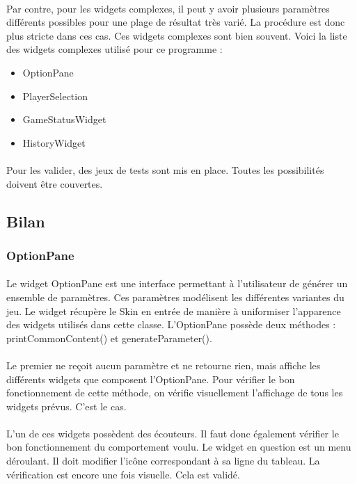\documentclass[11pt]{article} %
\begin{document}
\begin{sffamily}
\paragraph{}
Par contre, pour les widgets complexes, il peut y avoir plusieurs paramètres différents possibles pour une plage de résultat très varié. La procédure est donc plus stricte dans ces cas. Ces widgets complexes sont bien souvent. Voici la liste des widgets complexes utilisé pour ce programme :
\begin{itemize}
\item OptionPane
\item PlayerSelection
\item GameStatusWidget
\item HistoryWidget
\end{itemize}
\paragraph{}
Pour les valider, des jeux de tests sont mis en place. Toutes les possibilités doivent être couvertes.

\subsection{Bilan}
\subsubsection{OptionPane}
\paragraph{}
Le widget OptionPane est une interface permettant à l'utilisateur de générer un ensemble de paramètres. Ces paramètres modélisent les différentes variantes du jeu. Le widget récupère le Skin en entrée de manière à uniformiser l'apparence des widgets utilisés dans cette classe. L'OptionPane possède deux méthodes : printCommonContent() et generateParameter().
\paragraph{}
Le premier ne reçoit aucun paramètre et ne retourne rien, mais affiche les différents widgets que composent l'OptionPane. Pour vérifier le bon fonctionnement de cette méthode, on vérifie visuellement l'affichage de tous les widgets prévus. C'est le cas.
\paragraph{} 
L'un de ces widgets possèdent des écouteurs. Il faut donc également vérifier le bon fonctionnement du comportement voulu. Le widget en question est un menu déroulant. Il doit modifier l’icône correspondant à sa ligne du tableau. La vérification est encore une fois visuelle. Cela est validé.

\end{sffamily}
\end{document}
